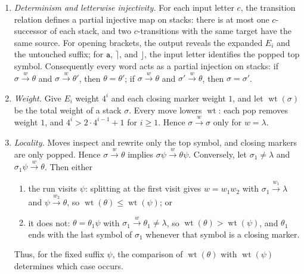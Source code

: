 \documentclass[11pt,a4paper]{article}
\theoremstyle{remark}
\theoremstyle{plain}
\begin{document}
\begin{enumerate}[label=\textup{(P\arabic*)},leftmargin=2.6em]
\item \emph{Determinism and letterwise injectivity.}
For each input letter $c$, the transition relation
defines a partial injective map on stacks:
there is at most one $c$-successor of each stack,
and two $c$-transitions with the same target
have the same source.
For opening brackets, the output reveals the
expanded $E_i$ and the untouched suffix;
for $\mathtt a$, $\rceil$, and $\rfloor$,
the input letter identifies the popped top symbol.
Consequently every word acts as a partial injection
on stacks: if $\sigma\xrightarrow{w}\theta$ and
$\sigma\xrightarrow{w}\theta'$, then $\theta=\theta'$;
if $\sigma\xrightarrow{w}\theta$ and
$\sigma'\xrightarrow{w}\theta$, then $\sigma=\sigma'$.

\item \emph{Weight.} Give $E_i$ weight $4^i$ and each closing marker
weight $1$, and let $\operatorname{wt}(\sigma)$ be the total weight of
a stack $\sigma$. Every move lowers $\operatorname{wt}$:
each pop removes weight $1$, and
$4^i>2\cdot4^{i-1}+1$ for $i\ge1$.
Hence $\sigma\xrightarrow{w}\sigma$ only for $w=\lambda$.

\item \emph{Locality.} Moves inspect and rewrite only the top symbol,
and closing markers are only popped. Hence
$\sigma\xrightarrow{w}\theta$ implies
$\sigma\psi\xrightarrow{w}\theta\psi$. Conversely, let
$\sigma_1\ne\lambda$ and $\sigma_1\psi\xrightarrow{w}\theta$. Then
either
\begin{enumerate}[label=\textup{(\alph*)},nosep]
\item the run visits $\psi$: splitting at the first visit gives
$w=w_1w_2$ with $\sigma_1\xrightarrow{w_1}\lambda$ and
$\psi\xrightarrow{w_2}\theta$, so
$\operatorname{wt}(\theta)\le\operatorname{wt}(\psi)$; or
\item it does not: $\theta=\theta_1\psi$ with
$\sigma_1\xrightarrow{w}\theta_1\ne\lambda$, so
$\operatorname{wt}(\theta)>\operatorname{wt}(\psi)$, and $\theta_1$ ends
with the last symbol of $\sigma_1$ whenever that symbol is a closing
marker.
\end{enumerate}
Thus, for the fixed suffix $\psi$, the comparison of
$\operatorname{wt}(\theta)$ with $\operatorname{wt}(\psi)$
determines which case occurs.
\end{enumerate}
\end{document}
